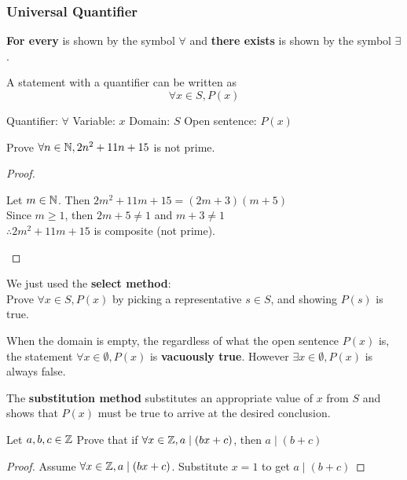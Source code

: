 \documentclass[english, 12pt]{article}
\begin{document}
\subsubsection{Universal Quantifier}
\begin{exmp}
\textbf{For every} is shown by the symbol $\forall$ and \textbf{there exists} is shown by the symbol $\exists$.
\end{exmp}
\begin{exmp}
A statement with a quantifier can be written as 
\[\forall x \in S, P(x) \]
\begin{center}
Quantifier: $\forall$\qquad
Variable: $x$\qquad
Domain: $S$\qquad
Open sentence: $P(x)$
\end{center}
\end{exmp}
\begin{exmp}
Prove $\forall n \in {\mathbb{N}} , 2n^2+11n+15$ is not prime.
\begin{proof}
\qquad
\begin{center}
Let $m \in {\mathbb{N}} $. Then $2m^2+11m+15 = (2m+3)(m+5)$\\
Since $m \geq 1$, then $2m+5 \neq 1$ and $m + 3 \neq 1$\\
$\therefore 2m^2+11m+15$ is composite (not prime).
\end{center}
\end{proof}
\end{exmp}
\begin{mthd}
We just used the \textbf{select method}:\\
Prove $\forall x \in S, P(x)$ by picking a representative $s \in S$, and showing $P(s)$ is true.
\end{mthd}
\begin{defn}
When the domain is empty, the regardless of what the open sentence $P(x)$ is, the statement $\forall x \in \emptyset, P(x)$ is \textbf{vacuously true}. However  $\exists x \in \emptyset, P(x)$ is always false.
\end{defn}
\begin{mthd}
The \textbf{substitution method} substitutes an appropriate value of $x$ from $S$ and shows that $P(x)$ must be true to arrive at the desired conclusion.
\end{mthd}
\begin{exmp}
Let $a,b,c \in {\mathbb{Z}}$ Prove that if $\forall x \in {\mathbb{Z}}, a \mid (bx+c)$, then $ a \mid (b+c)$
\begin{proof}
Assume $\forall x \in {\mathbb{Z}}, a \mid (bx+c)$. Substitute $x=1$ to get $a \mid (b+c)$
\end{proof}
\end{exmp}
\end{document}
